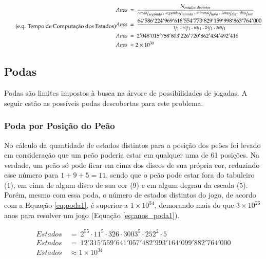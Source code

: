 \begin{equation} \label{eq:anos_estados} \tag{e.q. Tempo de Computação dos Estados}
\begin{split}
Anos\ &=\ \dfrac{N_{estados\ distintos}}{\nicefrac{estado}{segundo}\cdot\nicefrac{segundos}{minuto}\cdot\nicefrac{minutos}{hora}\cdot\nicefrac{horas}{dia}\cdot\nicefrac{dias}{ano}}\\
Anos\ &=\ \dfrac{64'586'224'969'618'554'770'829'159'998'863'764'000}{\nicefrac{1}{1}\cdot\nicefrac{60}{1}\cdot\nicefrac{60}{1}\cdot\nicefrac{24}{1}\cdot\nicefrac{365}{1}}\\
Anos\ &=\ 2'048'015'758'803'226'720'862'434'492'416\\
Anos\ &\approx 2\times10^{30}
\end{split}
\end{equation}

\subsection{Podas}

Podas são limites impostos à busca na árvore de possibilidades de jogadas. A seguir estão as possíveis podas descobertas para este problema.

\subsubsection{Poda por Posição do Peão}

No cálculo da quantidade de estados distintos para a posição dos peões foi levado em consideração que um peão poderia estar em qualquer uma de 61 posições. Na verdade, um peão só pode ficar em cima dos discos de sua própria cor, reduzindo esse número para $1+9+5=11$, sendo que o peão pode estar fora do tabuleiro (1), em cima de algum disco de sua cor (9) e em algum degrau da escada (5). Porém, mesmo com essa poda, o número de estados distintos do jogo, de acordo com a Equação \ref{eq:poda1}, é superior a $1\times 10^{34}$, demorando mais do que $3\times10^{26}$ anos para resolver um jogo (Equação \ref{eq:anos_poda1}).

\begin{equation} \label{eq:poda1} \tag{e.q. Poda por posição}
\begin{split}
	Estados\ &=\ 2^{55}\cdot11^{5}\cdot326\cdot3003^{5}\cdot252^{2}\cdot5\\
	Estados\ &=\ 12'315'559'641'057'482'993'164'099'882'764'000\\
	Estados\ &\approx 1\times 10^{34}
\end{split}
\end{equation}


